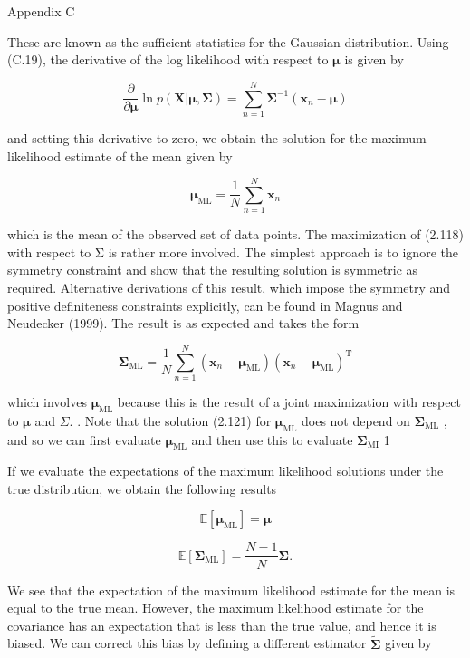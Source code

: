 \documentclass[
  10
]{article}
\begin{document}
Appendix C

These are known as the sufficient statistics for the Gaussian
distribution. Using (C.19), the derivative of the log likelihood with
respect to \(\pmb { \mu }\) is given by

\[
\frac {\partial}{\partial \boldsymbol {\mu}} \ln p (\mathbf {X} | \boldsymbol {\mu}, \boldsymbol {\Sigma}) = \sum_ {n = 1} ^ {N} \boldsymbol {\Sigma} ^ {- 1} \left(\mathbf {x} _ {n} - \boldsymbol {\mu}\right)\tag{2.120}
\]

and setting this derivative to zero, we obtain the solution for the
maximum likelihood estimate of the mean given by

\[
\pmb {\mu} _ {\mathrm{ML}} = \frac {1}{N} \sum_ {n = 1} ^ {N} \mathbf {x} _ {n}\tag{2.121}
\]

which is the mean of the observed set of data points. The maximization
of (2.118) with respect to Σ is rather more involved. The simplest
approach is to ignore the symmetry constraint and show that the
resulting solution is symmetric as required. Alternative derivations of
this result, which impose the symmetry and positive definiteness
constraints explicitly, can be found in Magnus and Neudecker (1999). The
result is as expected and takes the form

\[
\pmb {\Sigma} _ {\mathrm{ML}} = \frac {1}{N} \sum_ {n = 1} ^ {N} (\mathbf {x} _ {n} - \pmb {\mu} _ {\mathrm{ML}}) (\mathbf {x} _ {n} - \pmb {\mu} _ {\mathrm{ML}}) ^ {\mathrm{T}}\tag{2.122}
\]

which involves \(\pmb { \mu } _ { \mathrm { M L } }\) because this is
the result of a joint maximization with respect to \(\pmb { \mu }\) and
\(\Sigma .\) . Note that the solution (2.121) for
\(\pmb { \mu } _ { \mathrm { M L } }\) does not depend on
\(\pmb { \Sigma } _ { \mathrm { M L } }\) , and so we can first evaluate
\(\pmb { \mu } _ { \mathrm { M L } }\) and then use this to evaluate
\(\pmb { \Sigma } _ { \mathrm { M I } }\) 1

If we evaluate the expectations of the maximum likelihood solutions
under the true distribution, we obtain the following results

\[
\mathbb {E} [ \pmb {\mu} _ {\mathrm{ML}} ] = \pmb {\mu}\tag{2.123}
\]

\[
\mathbb {E} [ \pmb {\Sigma} _ {\mathrm{ML}} ] = \frac {N - 1}{N} \pmb {\Sigma}.\tag{2.124}
\]

We see that the expectation of the maximum likelihood estimate for the
mean is equal to the true mean. However, the maximum likelihood estimate
for the covariance has an expectation that is less than the true value,
and hence it is biased. We can correct this bias by defining a different
estimator \(\widetilde { \pmb { \Sigma } }\) given by
\end{document}
